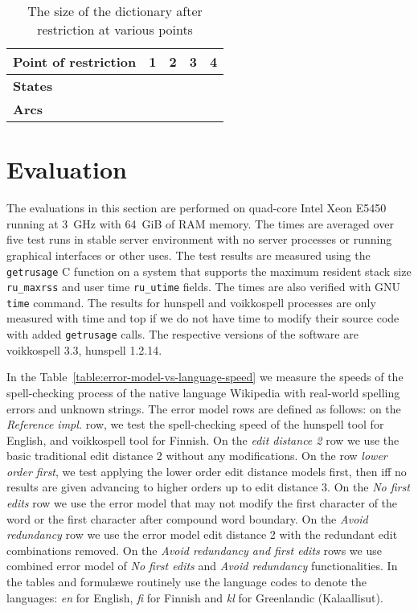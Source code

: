 \documentclass[11pt]{article}
\begin{document}
\begin{table}[h]
\begin{center}
\begin{scriptsize}
\begin{tabular}{|l|rrrr|}
\hline
\bf Point of restriction & \bf 1 & \bf 2 & \bf 3 & \bf 4 \\
\hline
\bf States \\
\bf Arcs \\
\hline
\end{tabular}
\caption{\label{restricted} The size of the dictionary after restriction at
various points}
\end{scriptsize}
\end{center}
\end{table}


\section{Evaluation}
\label{sec:evaluation}

The evaluations in this section are performed on quad-core Intel Xeon E5450
running at 3~GHz with 64~GiB of RAM memory. The times are averaged over five
test runs in stable server environment with no server processes or running
graphical interfaces or other uses. The test results are measured using the
\texttt{getrusage} C function on a system that supports the maximum resident
stack size \texttt{ru\_maxrss} and user time \texttt{ru\_utime} fields. The times
are also verified with GNU \texttt{time} command. The results for hunspell and
voikkospell processes are only measured with time and top if we do not have
time to modify their source code with added \texttt{getrusage} calls. The
respective versions of the software are voikkospell 3.3, hunspell 1.2.14.

In the Table~\ref{table:error-model-vs-language-speed} we measure the speeds of
the spell-checking process of the native language Wikipedia with real-world
spelling errors and unknown strings. The error model rows are defined as
follows: on the \emph{Reference impl.} row, we test the spell-checking speed of
the hunspell tool for English, and voikkospell tool for Finnish. On the
\emph{edit distance 2} row we use the basic traditional edit distance 2 without
any modifications. On the row \emph{lower order first}, we test applying the
lower order edit distance models first, then iff no results are given advancing
to higher orders up to edit distance 3. On the \emph{No first edits} row we
use the error model that may not modify the first character of the word or the
first character after compound word boundary. On the \emph{Avoid redundancy}
row we use the error model edit distance 2 with the redundant edit combinations
removed. On the \emph{Avoid redundancy and first edits} rows we use combined
error model of \emph{No first edits} and \emph{Avoid redundancy}
functionalities.  In the tables and formul\ae we routinely use the language
codes to denote the languages: \emph{en} for English, \emph{fi} for Finnish and
\emph{kl} for Greenlandic (Kalaallisut). 
\end{document}
